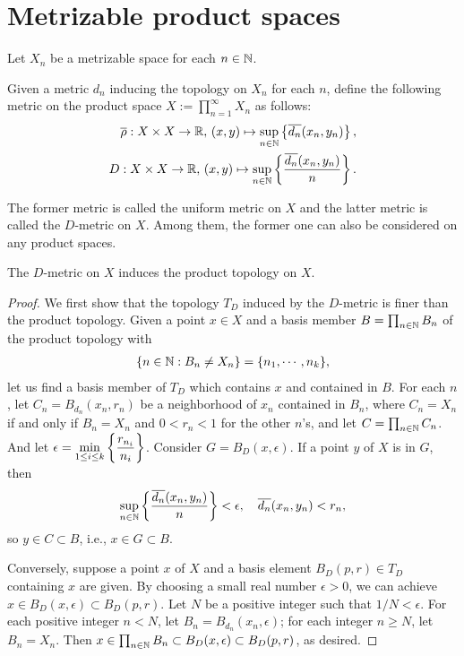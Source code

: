 \section{Metrizable product spaces}

Let $X_n$ be a metrizable space for each $n\in{\mathbb{N}}$.

\begin{nota}
    Given a metric $d_n$ inducing the topology on $X_n$ for each $n$,
    define the following metric on the product space $X:=\prod_{n=1}^\infty X_n$ as follows:
    \begin{align*}
        \overline{\rho}: X\times X\rightarrow{\mathbb{R}},\,(x, y)\mapsto\sup_{n\in{\mathbb{N}}}\left\{\overline{d_n}(x_n, y_n)\right\},\\
        D: X\times X\rightarrow{\mathbb{R}},\,(x, y)\mapsto\sup_{n\in{\mathbb{N}}}\left\{\frac{\overline{d_n}(x_n, y_n)}{n}\right\}.
    \end{align*}
\end{nota}

The former metric is called the uniform metric on $X$ and the latter metric is called the $D$-metric on $X$.
Among them, the former one can also be considered on any product spaces.

\begin{thm}
    The $D$-metric on $X$ induces the product topology on $X$.
\end{thm}

\begin{proof}
    We first show that the topology $T_D$ induced by the $D$-metric is finer than the product topology.
    Given a point $x\in X$ and a basis member $B=\prod_{n\in{\mathbb{N}}}B_n$ of the product topology with
    \begin{align*}
        \displaystyle{\{n\in{\mathbb{N}}:B_n\neq X_n\}=\{n_1, \cdots, n_k\}},
    \end{align*}
    let us find a basis member of $T_D$ which contains $x$ and contained in $B$.
    For each $n$, let $C_n=B_{d_n}(x_n, r_n)$ be a neighborhood of $x_n$ contained in $B_n$, where $C_n=X_n$ if and only if $B_n=X_n$ and $0<r_n<1$ for the other $n$'s, and let $C=\prod_{n\in{\mathbb{N}}}C_n$.
    And let $\displaystyle{\epsilon=\min_{1\leq i\leq k}\left\{\frac{r_{n_i}}{n_i}\right\}}$.
    Consider $G=B_D(x, \epsilon)$.
    If a point $y$ of $X$ is in $G$, then
    \begin{align*}
        \sup_{n\in{\mathbb{N}}}\left\{\frac{\overline{d_n}(x_n, y_n)}{n}\right\} < \epsilon,\quad\overline{d_n}(x_n, y_n) < r_n,
    \end{align*}
    so $y\in C\subset B$, i.e., $x\in G\subset B$.
    
    Conversely, suppose a point $x$ of $X$ and a basis element $B_D(p, r)\in T_D$ containing $x$ are given.
    By choosing a small real number $\epsilon>0$, we can achieve $x\in B_D(x, \epsilon)\subset B_D(p, r)$.
    Let $N$ be a positive integer such that $1/N < \epsilon$.
    For each positive integer $n<N$, let $B_n=B_{d_n}(x_n, \epsilon)$; for each integer $n\geq N$, let $B_n=X_n$.
    Then $x\in\prod_{n\in{\mathbb{N}}}B_n\subset B_D(x, \epsilon)\subset B_D(p, r)$, as desired.
\end{proof}

